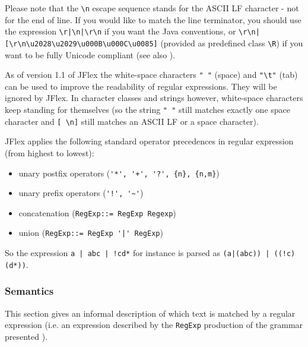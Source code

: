 \documentclass[11pt]{scrartcl}
\begin{document}
Please note that the \verb+\n+ escape sequence stands for the ASCII
LF character - not for the end of line. If you would like to match the
line terminator, you should use the expression \verb+\r|\n|\r\n+ if you want
the Java conventions, or \verb+\r\n|[\r\n\u2028\u2029\u000B\u000C\u0085]+
(provided as predefined class \verb+\R+) if you want to be fully Unicode
compliant (see also \cite{unicode_rep}).

As of version 1.1 of JFlex the white-space characters \texttt{" "}
(space) and \verb+"\t"+ (tab) can be used to improve the readability of
regular expressions. They will be ignored by JFlex. In character
classes and strings however, white-space characters keep standing for
themselves (so the string \texttt{" "} still matches exactly one space
character and \verb+[ \n]+ still matches an ASCII LF or a space
character).

JFlex applies the following standard operator precedences in regular
expression (from highest to lowest):

\begin{itemize}
\item
unary postfix operators (\verb-'*', '+', '?', {n}, {n,m}-)

\item
unary prefix operators (\verb-'!', '~'-)

\item
concatenation (\texttt{RegExp::= RegExp Regexp})

\item
union (\verb-RegExp::= RegExp '|' RegExp-)
\end{itemize}

So the expression \verb+a | abc | !cd*+ for instance is parsed as 
\verb+(a|(abc)) | ((!c)(d*))+.

\subsubsection{Semantics\label{Semantics}}
This section gives an informal description of which text is matched by
a regular expression (i.e. an expression described by the \texttt{RegExp}
production of the grammar presented ).
\end{document}
